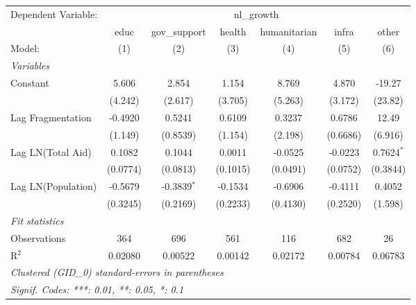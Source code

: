 \begingroup
\centering
\begin{tabular}{lcccccc}
   \tabularnewline \midrule \midrule
   Dependent Variable: & \multicolumn{6}{c}{nl\_growth}\\
                      & educ     & gov\_support  & health   & humanitarian & infra    & other \\   
   Model:             & (1)      & (2)           & (3)      & (4)          & (5)      & (6)\\  
   \midrule
   \emph{Variables}\\
   Constant           & 5.606    & 2.854         & 1.154    & 8.769        & 4.870    & -19.27\\   
                      & (4.242)  & (2.617)       & (3.705)  & (5.263)      & (3.172)  & (23.82)\\   
   Lag Fragmentation  & -0.4920  & 0.5241        & 0.6109   & 0.3237       & 0.6786   & 12.49\\   
                      & (1.149)  & (0.8539)      & (1.154)  & (2.198)      & (0.6686) & (6.916)\\   
   Lag LN(Total Aid)  & 0.1082   & 0.1044        & 0.0011   & -0.0525      & -0.0223  & 0.7624$^{*}$\\   
                      & (0.0774) & (0.0813)      & (0.1015) & (0.0491)     & (0.0752) & (0.3844)\\   
   Lag LN(Population) & -0.5679  & -0.3839$^{*}$ & -0.1534  & -0.6906      & -0.4111  & 0.4052\\   
                      & (0.3245) & (0.2169)      & (0.2233) & (0.4130)     & (0.2520) & (1.598)\\   
   \midrule
   \emph{Fit statistics}\\
   Observations       & 364      & 696           & 561      & 116          & 682      & 26\\  
   R$^2$              & 0.02080  & 0.00522       & 0.00142  & 0.02172      & 0.00784  & 0.06783\\  
   \midrule \midrule
   \multicolumn{7}{l}{\emph{Clustered (GID\_0) standard-errors in parentheses}}\\
   \multicolumn{7}{l}{\emph{Signif. Codes: ***: 0.01, **: 0.05, *: 0.1}}\\
\end{tabular}
\par\endgroup



